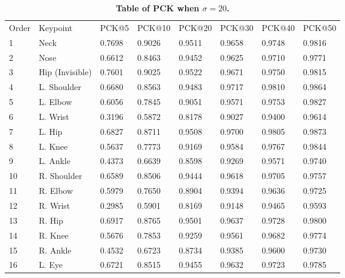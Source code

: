 \documentclass[10pt,letterpaper]{article}
\newlength\savedwidth
\newcommand\thickhline{\noalign{\global\savedwidth\arrayrulewidth\global\arrayrulewidth 2pt}%
	\hline
	\noalign{\global\arrayrulewidth\savedwidth}}
\begin{document}
\begin{table}[!ht]
	\begin{adjustwidth}{-2.25in}{0in} %
		\centering
		\caption{
			{\bf Table of PCK when $\sigma=20$.}}
		\begin{tabular}{|l|l|l|l|l|l|l|l|}
			\hline
			Order & Keypoint & PCK@5 & PCK@10 & PCK@20 & PCK@30 & PCK@40 & PCK@50 \\ \thickhline
			1     &  Neck       &0.7698 & 0.9026 & 0.9511 & 0.9658 & 0.9748 & 0.9816       \\ \hline
			2     &  Nose        &  0.6612 & 0.8463 & 0.9452 & 0.9625 & 0.9710 & 0.9771        \\ \hline
			3     &  Hip (Invisible)        & 0.7601 & 0.9025 & 0.9522 & 0.9671 & 0.9750 & 0.9815       \\ \hline
			4     &  L. Shoulder         & 0.6680 & 0.8563 & 0.9483 & 0.9717 & 0.9810 & 0.9864       \\ \hline
			5     &  L. Elbow        & 0.6056 & 0.7845 & 0.9051 & 0.9571 & 0.9753 & 0.9827      \\ \hline
			6     &  L. Wrist        & 0.3196 & 0.5872 & 0.8178 & 0.9027 & 0.9400 & 0.9614      \\ \hline
			7     &  L. Hip        &  0.6827 & 0.8711 & 0.9508 & 0.9700 & 0.9805 & 0.9873      \\ \hline
			8     &  L. Knee         & 0.5637 & 0.7773 & 0.9169 & 0.9584 & 0.9767 & 0.9844      \\ \hline
			9     &  L. Ankle         &  0.4373 & 0.6639 & 0.8598 & 0.9269 & 0.9571 & 0.9740       \\ \hline
			10    &  R. Shoulder        & 0.6589 & 0.8506 & 0.9444 & 0.9618 & 0.9705 & 0.9757      \\ \hline
			11    &  R. Elbow        & 0.5979 & 0.7650 & 0.8904 & 0.9394 & 0.9636 & 0.9725      \\ \hline
			12    &  R. Wrist        & 0.2985 & 0.5901 & 0.8169 & 0.9148 & 0.9465 & 0.9593      \\ \hline
			13    &  R. Hip        & 0.6917 & 0.8765 & 0.9501 & 0.9637 & 0.9728 & 0.9800     \\ \hline
			14    &  R. Knee        &  0.5676 & 0.7853 & 0.9259 & 0.9561 & 0.9682 & 0.9774       \\ \hline
			15    &  R. Ankle        & 0.4532 & 0.6723 & 0.8734 & 0.9385 & 0.9600 & 0.9730     \\ \hline
			16    &  L. Eye        & 
			0.6721 & 0.8515 & 0.9455 & 0.9632 & 0.9723 & 0.9785      \\ \hline

\end{tabular}
\end{adjustwidth}
\end{table}
\end{document}
